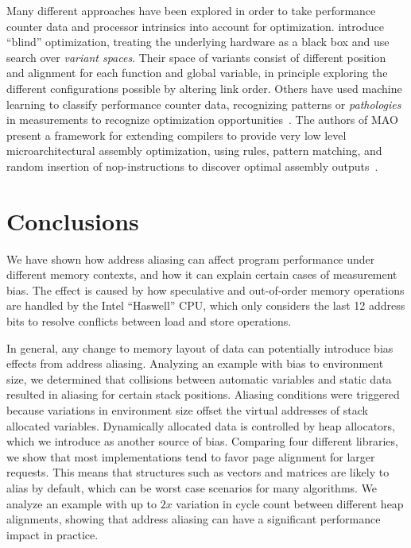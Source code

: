 \documentclass[prodmode,acmtaco]{acmsmall}
\begin{document}
Many different approaches have been explored in order to take performance counter data and processor intrinsics into account for optimization.
 introduce ``blind'' optimization, treating the underlying hardware as a black box and use search over \emph{variant spaces}.
Their space of variants consist of different position and alignment for each function and global variable, in principle exploring the different configurations possible by altering link order.
Others have used machine learning to classify performance counter data, recognizing patterns or \emph{pathologies} in measurements to recognize optimization opportunities~\cite{Yoo:ADD}.
The authors of MAO present a framework for extending compilers to provide very low level microarchitectural assembly optimization, using rules, pattern matching, and random insertion of nop-instructions to discover optimal assembly outputs~\cite{Hundt:2011:MAO}. 


\section{Conclusions}
\label{sec:conclusions}
We have shown how address aliasing can affect program performance under different memory contexts, and how it can explain certain cases of measurement bias. 
The effect is caused by how speculative and out-of-order memory operations are handled by the Intel ``Haswell'' CPU, which only considers the last 12 address bits to resolve conflicts between load and store operations.

In general, any change to memory layout of data can potentially introduce bias effects from address aliasing.
Analyzing an example with bias to environment size, we determined that collisions between automatic variables and static data resulted in aliasing for certain stack positions.
Aliasing conditions were triggered because variations in environment size offset the virtual addresses of stack allocated variables.
Dynamically allocated data is controlled by heap allocators, which we introduce as another source of bias.
Comparing four different libraries, we show that most implementations tend to favor page alignment for larger requests.
This means that structures such as vectors and matrices are likely to alias by default, which can be worst case scenarios for many algorithms.
We analyze an example with up to $2x$ variation in cycle count between different heap alignments, showing that address aliasing can have a significant performance impact in practice.
\end{document}
